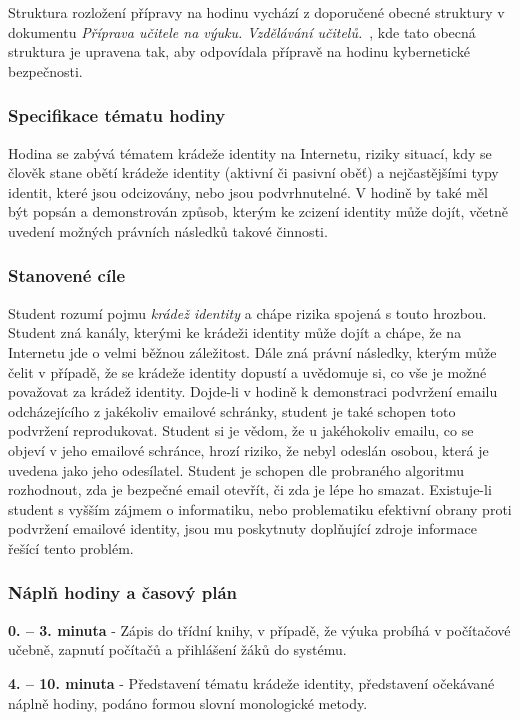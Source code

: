 \documentclass[a4paper, 12pt]{article}
\begin{document}
Struktura rozložení přípravy na hodinu vychází z doporučené obecné struktury v dokumentu \textit{Příprava učitele na výuku. Vzdělávání učitelů.}~\cite{presentationPavlaZ}, kde tato obecná struktura je upravena tak, aby odpovídala přípravě na hodinu kybernetické bezpečnosti.

\subsubsection{Specifikace tématu hodiny}
Hodina se zabývá tématem krádeže identity na Internetu, riziky situací, kdy se člověk stane obětí krádeže identity (aktivní či pasivní oběť) a nejčastějšími typy identit, které jsou odcizovány, nebo jsou podvrhnutelné. V hodině by také měl být popsán a demonstrován způsob, kterým ke zcizení identity může dojít, včetně uvedení možných právních následků takové činnosti.

\subsubsection{Stanovené cíle}
Student rozumí pojmu \textit{krádež identity} a chápe rizika spojená s touto hrozbou. Student zná kanály, kterými ke krádeži identity může dojít a chápe, že na Internetu jde o velmi běžnou záležitost. Dále zná právní následky, kterým může čelit v případě, že se krádeže identity dopustí a uvědomuje si, co vše je možné považovat za krádež identity. Dojde-li v hodině k demonstraci podvržení emailu odcházejícího z jakékoliv emailové schránky, student je také schopen toto podvržení reprodukovat. Student si je vědom, že u jakéhokoliv emailu, co se objeví v jeho emailové schránce, hrozí riziko, že nebyl odeslán osobou, která je uvedena jako jeho odesílatel. Student je schopen dle probraného algoritmu rozhodnout, zda je bezpečné email otevřít, či zda je lépe ho smazat. Existuje-li student s vyšším zájmem o informatiku, nebo problematiku efektivní obrany proti podvržení emailové identity, jsou mu poskytnuty doplňující zdroje informace řešící tento problém.

\subsubsection{Náplň hodiny a časový plán}
\indent\textbf{0. -- 3. minuta} - Zápis do třídní knihy, v případě, že výuka probíhá v počítačové učebně, zapnutí počítačů a přihlášení žáků do systému.

\textbf{4. -- 10. minuta} - Představení tématu krádeže identity, představení očekávané náplně hodiny, podáno formou slovní monologické metody.
\end{document}
